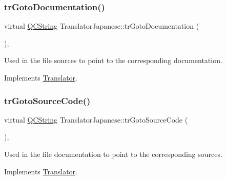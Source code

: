 \mbox{\label{class_translator_japanese_a5bff5a3ad64b157e71b5dfa39b7643c5}} 
\subsubsection{\texorpdfstring{trGotoDocumentation()}{trGotoDocumentation()}}
{\footnotesize\ttfamily virtual \mbox{\hyperlink{class_q_c_string}{Q\+C\+String}} Translator\+Japanese\+::tr\+Goto\+Documentation (\begin{DoxyParamCaption}{ }\end{DoxyParamCaption})\hspace{0.3cm}{\ttfamily [inline]}, {\ttfamily [virtual]}}

Used in the file sources to point to the corresponding documentation. 

Implements \mbox{\hyperlink{class_translator}{Translator}}.

\mbox{\label{class_translator_japanese_a22a29bc4bb4e274586b19b8412906384}} 
\subsubsection{\texorpdfstring{trGotoSourceCode()}{trGotoSourceCode()}}
{\footnotesize\ttfamily virtual \mbox{\hyperlink{class_q_c_string}{Q\+C\+String}} Translator\+Japanese\+::tr\+Goto\+Source\+Code (\begin{DoxyParamCaption}{ }\end{DoxyParamCaption})\hspace{0.3cm}{\ttfamily [inline]}, {\ttfamily [virtual]}}

Used in the file documentation to point to the corresponding sources. 

Implements \mbox{\hyperlink{class_translator}{Translator}}.

\mbox{\label{class_translator_japanese_a487dfcdae65de19b8d6f2b77e37b3bfd}} 
